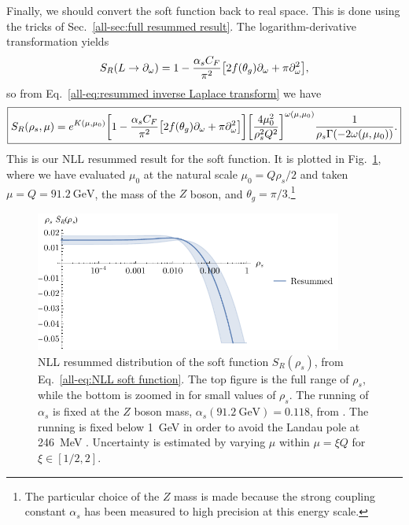 \documentclass[../thesis.tex]{subfiles}
\begin{document}
	Finally, we should convert the soft function back to real space. This is done using the tricks of Sec.~\ref{all-sec:full resummed result}. The logarithm-derivative transformation yields
	\begin{equation}
		S_R(L \to \partial_{\omega}) = 1 -\frac{\alpha_s C_F}{\pi^2}\qty[2f(\theta_g) \partial_{\omega} + \pi \partial^2_{\omega}],
	\end{equation}
	so from Eq.~\ref{all-eq:resummed inverse Laplace transform} we have
	\begin{equation}\label{all-eq:NLL soft function}
	\boxed{
		S_R(\rho_s, \mu) = e^{K(\mu, \mu_0)} \qty[1 - \frac{\alpha_s C_F}{\pi^2} \qty[2f(\theta_g) \partial_{\omega} + \pi \partial^2_{\omega}]] \qty[\frac{4\mu_0^2}{\rho_s^2 Q^2}]^{\omega(\mu, \mu_0)} \frac{1}{\rho_s \Gamma(-2\omega(\mu, \mu_0))}.
	}
	\end{equation}
	This is our NLL resummed result for the soft function. It is plotted in Fig.~\ref{all-fig:resummed result}, where we have evaluated $\mu_0$ at the natural scale $\mu_0 = Q\rho_s / 2$ and taken $\mu = Q = \SI{91.2}{\giga\electronvolt}$, the mass of the $Z$ boson, and $\theta_g = \pi/3$.\footnote{The particular choice of the $Z$ mass is made because the strong coupling constant $\alpha_s$ has been measured to high precision at this energy scale.}

	\begin{figure}
	\begin{center}
		\includegraphics[width=0.9\textwidth]{figures/resummation_plot.pdf}

		\caption{\label{all-fig:resummed result}NLL resummed distribution of the soft function $S_R(\rho_s)$, from Eq.~\ref{all-eq:NLL soft function}. The top figure is the full range of $\rho_s$, while the bottom is zoomed in for small values of $\rho_s$. The running of $\alpha_s$ is fixed at the $Z$ boson mass, $\alpha_s(\SI{91.2}{\giga\electronvolt}) = 0.118$, from \cite{particle_data_group_review_2020}. The running is fixed below \SI{1}{\giga\electronvolt} in order to avoid the Landau pole at \SI{246}{\mega\electronvolt} \cite{larkoski_elementary_2019-1}. Uncertainty is estimated by varying $\mu$ within $\mu = \xi Q$ for $\xi \in [1/2, 2]$.}
	\end{center}
	\end{figure}
\end{document}
